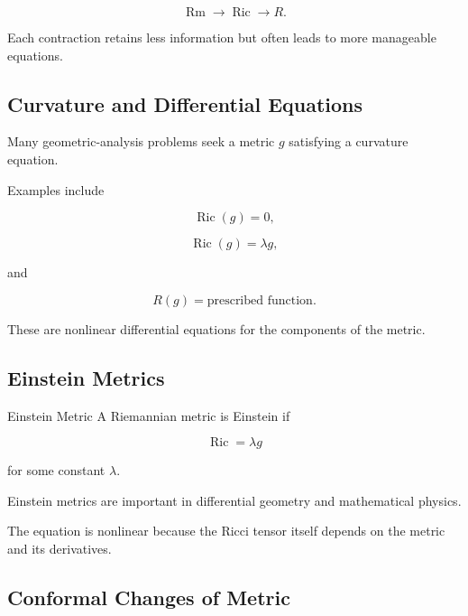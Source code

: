 \[
\boxed{
\operatorname{Rm}
\longrightarrow
\operatorname{Ric}
\longrightarrow
R.
}
\]

Each contraction retains less information but often leads to more
manageable equations.

\subsection{Curvature and Differential Equations}
\label{subsec:curvature-differential-equations}

Many geometric-analysis problems seek a metric \(g\) satisfying a
curvature equation.

Examples include

\[
\boxed{
\operatorname{Ric}(g)=0,
}
\]

\[
\boxed{
\operatorname{Ric}(g)=\lambda g,
}
\]

and

\[
\boxed{
R(g)=\text{prescribed function}.
}
\]

These are nonlinear differential equations for the components of the
metric.

\subsection{Einstein Metrics}
\label{subsec:einstein-metrics}

\begin{definitionbox}{Einstein Metric}
A Riemannian metric is Einstein if

\[
\boxed{
\operatorname{Ric}
=
\lambda g
}
\]

for some constant \(\lambda\).
\end{definitionbox}

Einstein metrics are important in differential geometry and mathematical
physics.

The equation is nonlinear because the Ricci tensor itself depends on the
metric and its derivatives.

\subsection{Conformal Changes of Metric}
\label{subsec:conformal-change-metric}

